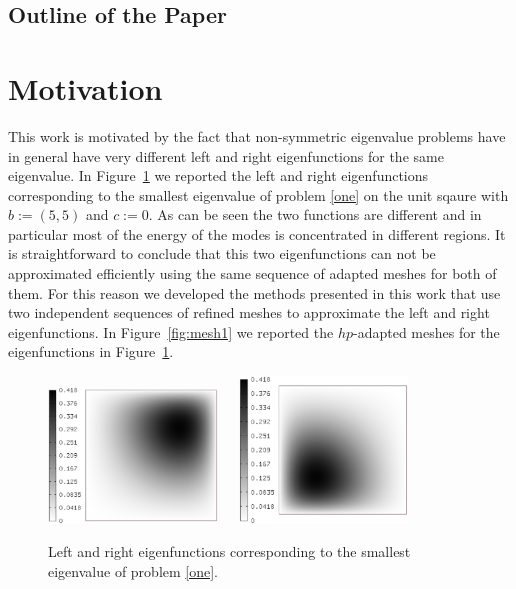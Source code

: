 \documentclass[preprint,12pt]{elsarticle}
\begin{document}
\subsection{Outline of the Paper}



\section{Motivation}\label{sec:motiv}

This work is motivated by the fact that non-symmetric eigenvalue problems have in general have very different left and right eigenfunctions for the same eigenvalue.
In Figure~\ref{fig:eigen1} we reported the left and right eigenfunctions corresponding to the smallest eigenvalue of problem \eqref{one} on the unit sqaure with $b:=(5,5)$ and $c:=0$. 
As can be seen the two functions are different and in particular most of the energy of the modes is concentrated in different regions. It is straightforward to conclude that this two eigenfunctions can not be approximated efficiently using the same sequence of adapted meshes for both of them. For this reason we developed the methods presented in this work that use two independent sequences of refined meshes to approximate the left and right eigenfunctions.
In Figure~\ref{fig:mesh1} we reported the $hp$-adapted meshes for the eigenfunctions in Figure~\ref{fig:eigen1}.

\begin{figure}[!ht]
\begin{center}
\includegraphics[width=0.4\textwidth]{eig1.eps}\ \ \ 
\includegraphics[width=0.4\textwidth]{eig2.eps}\\
\end{center}
\caption{Left and right eigenfunctions corresponding to the smallest eigenvalue of problem \eqref{one}. }
\label{fig:eigen1}
\end{figure}
\end{document}
